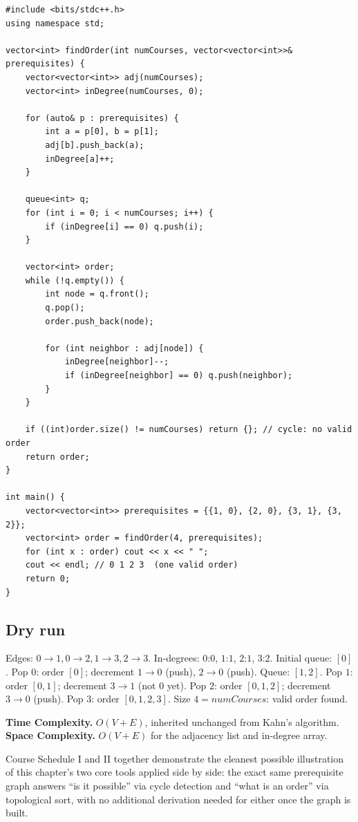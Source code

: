 \begin{lstlisting}
#include <bits/stdc++.h>
using namespace std;

vector<int> findOrder(int numCourses, vector<vector<int>>& prerequisites) {
    vector<vector<int>> adj(numCourses);
    vector<int> inDegree(numCourses, 0);

    for (auto& p : prerequisites) {
        int a = p[0], b = p[1];
        adj[b].push_back(a);
        inDegree[a]++;
    }

    queue<int> q;
    for (int i = 0; i < numCourses; i++) {
        if (inDegree[i] == 0) q.push(i);
    }

    vector<int> order;
    while (!q.empty()) {
        int node = q.front();
        q.pop();
        order.push_back(node);

        for (int neighbor : adj[node]) {
            inDegree[neighbor]--;
            if (inDegree[neighbor] == 0) q.push(neighbor);
        }
    }

    if ((int)order.size() != numCourses) return {}; // cycle: no valid order
    return order;
}

int main() {
    vector<vector<int>> prerequisites = {{1, 0}, {2, 0}, {3, 1}, {3, 2}};
    vector<int> order = findOrder(4, prerequisites);
    for (int x : order) cout << x << " ";
    cout << endl; // 0 1 2 3  (one valid order)
    return 0;
}
\end{lstlisting}

\subsection*{Dry run}


Edges: $0\to1,0\to2,1\to3,2\to3$. In-degrees: $0$:$0$, $1$:$1$,
$2$:$1$, $3$:$2$. Initial queue: $[0]$. Pop $0$: order $[0]$; decrement
$1\to0$ (push), $2\to0$ (push). Queue: $[1,2]$. Pop $1$: order
$[0,1]$; decrement $3\to1$ (not $0$ yet). Pop $2$: order $[0,1,2]$;
decrement $3\to0$ (push). Pop $3$: order $[0,1,2,3]$. Size $4 =
\textit{numCourses}$: valid order found.

\begin{complexitybox}
\textbf{Time Complexity.} $O(V+E)$, inherited unchanged from Kahn's
algorithm.
\textbf{Space Complexity.} $O(V+E)$ for the adjacency list and
in-degree array.
\end{complexitybox}

\begin{takeawaybox}
Course Schedule I and II together demonstrate the cleanest possible
illustration of this chapter's two core tools applied side by side:
the exact same prerequisite graph answers ``is it possible'' via cycle
detection and ``what is an order'' via topological sort, with no
additional derivation needed for either once the graph is built.
\end{takeawaybox}

